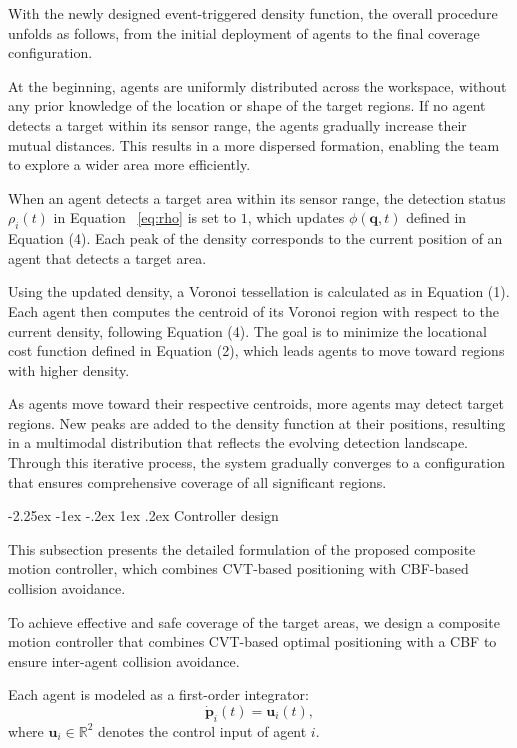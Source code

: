 \documentclass[fleqn,10pt,twocolumn]{main}
\makeatletter
\renewcommand\subsection{\@startsection{subsection}{2}{\z@}
  {-2.25ex \@plus -1ex \@minus -.2ex}
  {1ex \@plus .2ex}
  {\normalfont\normalsize\bfseries}}
\makeatother
\begin{document}
With the newly designed event-triggered density function, the overall procedure unfolds as follows, from the initial deployment of agents to the final coverage configuration.

At the beginning, agents are uniformly distributed across the workspace, without any prior knowledge of the location or shape of the target regions. If no agent detects a target within its sensor range, the agents gradually increase their mutual distances. This results in a more dispersed formation, enabling the team to explore a wider area more efficiently.

When an agent detects a target area within its sensor range, the detection status $\rho_i(t)$ in Equation ~\eqref{eq:rho} is set to $1$, which updates $\phi(\boldsymbol{q}, t)$ defined in Equation (4). Each peak of the density corresponds to the current position of an agent that detects a target area.

Using the updated density, a Voronoi tessellation is calculated as in Equation (1). Each agent then computes the centroid of its Voronoi region with respect to the current density, following Equation (4). The goal is to minimize the locational cost function defined in Equation (2), which leads agents to move toward regions with higher density.

As agents move toward their respective centroids, more agents may detect target regions. New peaks are added to the density function at their positions, resulting in a multimodal distribution that reflects the evolving detection landscape. Through this iterative process, the system gradually converges to a configuration that ensures comprehensive coverage of all significant regions.

\subsection{Controller design}

This subsection presents the detailed formulation of the proposed composite motion controller, which combines CVT-based positioning with CBF-based collision avoidance.

To achieve effective and safe coverage of the target areas, we design a composite motion controller that combines CVT-based optimal positioning with a CBF to ensure inter-agent collision avoidance.

Each agent is modeled as a first-order integrator:
\begin{equation}\label{dynamics}
    \dot{\boldsymbol{p}}_{i}(t) = \boldsymbol{u}_{i}(t),
\end{equation}
where $\boldsymbol{u}_i \in \mathbb{R}^2$ denotes the control input of agent $i$.
\end{document}
